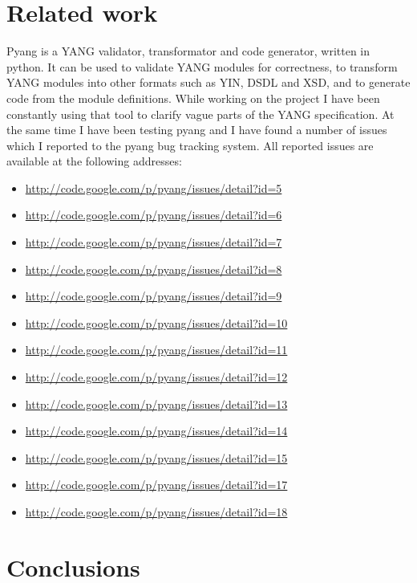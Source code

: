 \documentclass[conference]{IEEEtran}
\begin{document}
\section{Related work}
Pyang \cite{bib8} is a YANG validator, transformator and code generator, written in python. It can be used to validate YANG modules for correctness, to transform YANG modules into other formats such as YIN, DSDL and XSD, and to generate code from the module definitions. While working on the project I have been constantly using that tool to clarify vague parts of the YANG specification. At the same time I have been testing pyang and I have found a number of issues which I reported to the pyang bug tracking system. All reported issues are available at the following addresses:
\begin{itemize}
\item \url{http://code.google.com/p/pyang/issues/detail?id=5}
\item \url{http://code.google.com/p/pyang/issues/detail?id=6}
\item \url{http://code.google.com/p/pyang/issues/detail?id=7}
\item \url{http://code.google.com/p/pyang/issues/detail?id=8}
\item \url{http://code.google.com/p/pyang/issues/detail?id=9}
\item \url{http://code.google.com/p/pyang/issues/detail?id=10}
\item \url{http://code.google.com/p/pyang/issues/detail?id=11}
\item \url{http://code.google.com/p/pyang/issues/detail?id=12}
\item \url{http://code.google.com/p/pyang/issues/detail?id=13}
\item \url{http://code.google.com/p/pyang/issues/detail?id=14}
\item \url{http://code.google.com/p/pyang/issues/detail?id=15}
\item \url{http://code.google.com/p/pyang/issues/detail?id=17}
\item \url{http://code.google.com/p/pyang/issues/detail?id=18}
\end{itemize}

\section{Conclusions}
\end{document}
